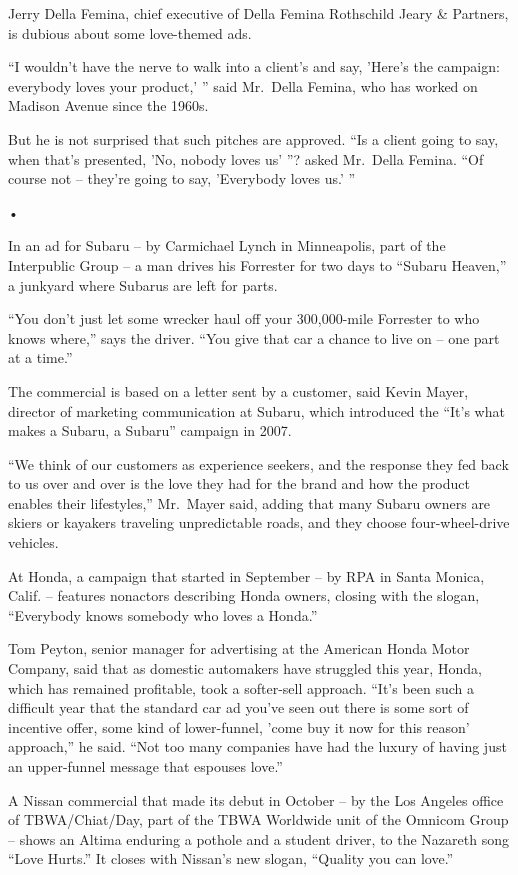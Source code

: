 ﻿\documentclass[12pt]{article}
\begin{document}
Jerry Della Femina, chief executive of Della Femina Rothschild Jeary \& Partners, is dubious about
some love-themed ads.

``I wouldn't have the nerve to walk into a client's and say, 'Here's the campaign: everybody loves
your product,' '' said Mr.~Della Femina, who has worked on Madison Avenue since the 1960s.

But he is not surprised that such pitches are approved. ``Is a client going to say, when that's
presented, 'No, nobody loves us' ''? asked Mr.~Della Femina. ``Of course not -- they're going to
say, 'Everybody loves us.' ''

•

In an ad for Subaru -- by Carmichael Lynch in Minneapolis, part of the Interpublic Group -- a man
drives his Forrester for two days to ``Subaru Heaven,'' a junkyard where Subarus are left for parts.

``You don't just let some wrecker haul off your 300,000-mile Forrester to who knows where,'' says
the driver. ``You give that car a chance to live on -- one part at a time.''

The commercial is based on a letter sent by a customer, said Kevin Mayer, director of marketing
communication at Subaru, which introduced the ``It's what makes a Subaru, a Subaru'' campaign in
2007.

``We think of our customers as experience seekers, and the response they fed back to us over and
over is the love they had for the brand and how the product enables their lifestyles,'' Mr.~Mayer
said, adding that many Subaru owners are skiers or kayakers traveling unpredictable roads, and they
choose four-wheel-drive vehicles.

At Honda, a campaign that started in September -- by RPA in Santa Monica, Calif. -- features
nonactors describing Honda owners, closing with the slogan, ``Everybody knows somebody who loves a
Honda.''

Tom Peyton, senior manager for advertising at the American Honda Motor Company, said that as
domestic automakers have struggled this year, Honda, which has remained profitable, took a
softer-sell approach. ``It's been such a difficult year that the standard car ad you've seen out
there is some sort of incentive offer, some kind of lower-funnel, 'come buy it now for this reason'
approach,'' he said. ``Not too many companies have had the luxury of having just an upper-funnel
message that espouses love.''

A Nissan commercial that made its debut in October -- by the Los Angeles office of TBWA/Chiat/Day,
part of the TBWA Worldwide unit of the Omnicom Group -- shows an Altima enduring a pothole and a
student driver, to the Nazareth song ``Love Hurts.'' It closes with Nissan's new slogan, ``Quality
you can love.''
\end{document}
